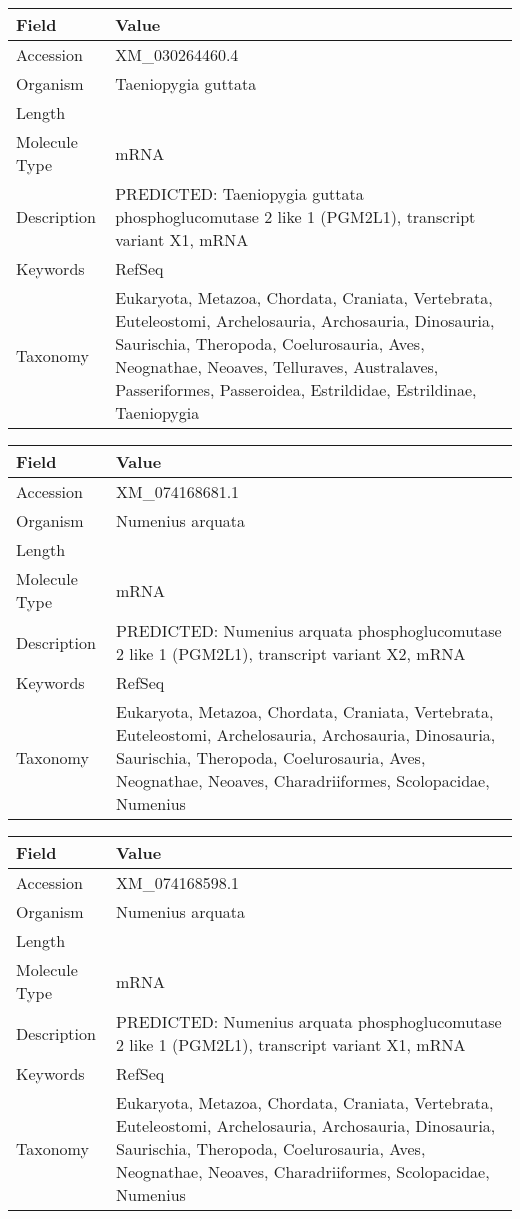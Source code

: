 \documentclass[10pt]{article}
\begin{document}
{\footnotesize
\begin{longtable}{>{\raggedright\arraybackslash}p{4.5cm} >{\raggedright\arraybackslash}p{11.5cm}}
\textbf{Field} & \textbf{Value} \\
\hline
Accession & XM\_030264460.4 \\
Organism & Taeniopygia guttata \\
Length & 6033 \\
Molecule Type & mRNA \\
Description & PREDICTED: Taeniopygia guttata phosphoglucomutase 2 like 1 (PGM2L1), transcript variant X1, mRNA \\
Keywords & RefSeq \\
Taxonomy & Eukaryota, Metazoa, Chordata, Craniata, Vertebrata, Euteleostomi, Archelosauria, Archosauria, Dinosauria, Saurischia, Theropoda, Coelurosauria, Aves, Neognathae, Neoaves, Telluraves, Australaves, Passeriformes, Passeroidea, Estrildidae, Estrildinae, Taeniopygia \\
\end{longtable}
}

{\footnotesize
\begin{longtable}{>{\raggedright\arraybackslash}p{4.5cm} >{\raggedright\arraybackslash}p{11.5cm}}
\textbf{Field} & \textbf{Value} \\
\hline
Accession & XM\_074168681.1 \\
Organism & Numenius arquata \\
Length & 2051 \\
Molecule Type & mRNA \\
Description & PREDICTED: Numenius arquata phosphoglucomutase 2 like 1 (PGM2L1), transcript variant X2, mRNA \\
Keywords & RefSeq \\
Taxonomy & Eukaryota, Metazoa, Chordata, Craniata, Vertebrata, Euteleostomi, Archelosauria, Archosauria, Dinosauria, Saurischia, Theropoda, Coelurosauria, Aves, Neognathae, Neoaves, Charadriiformes, Scolopacidae, Numenius \\
\end{longtable}
}

{\footnotesize
\begin{longtable}{>{\raggedright\arraybackslash}p{4.5cm} >{\raggedright\arraybackslash}p{11.5cm}}
\textbf{Field} & \textbf{Value} \\
\hline
Accession & XM\_074168598.1 \\
Organism & Numenius arquata \\
Length & 2036 \\
Molecule Type & mRNA \\
Description & PREDICTED: Numenius arquata phosphoglucomutase 2 like 1 (PGM2L1), transcript variant X1, mRNA \\
Keywords & RefSeq \\
Taxonomy & Eukaryota, Metazoa, Chordata, Craniata, Vertebrata, Euteleostomi, Archelosauria, Archosauria, Dinosauria, Saurischia, Theropoda, Coelurosauria, Aves, Neognathae, Neoaves, Charadriiformes, Scolopacidae, Numenius \\
\end{longtable}
}
\end{document}
